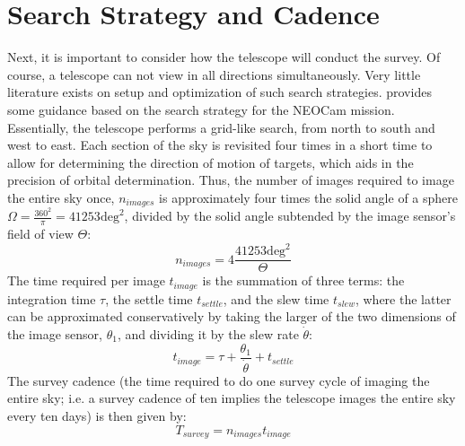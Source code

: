 \section{Search Strategy and Cadence}
\label{sec:modelling_cadence}
Next, it is important to consider how the telescope will conduct the survey. Of course, a telescope can not view in all directions simultaneously. Very little literature exists on setup and optimization of such search strategies. \cite{Cadence} provides some guidance based on the search strategy for the NEOCam mission. Essentially, the telescope performs a grid-like search, from north to south and west to east. Each section of the sky is revisited four times in a short time to allow for determining the direction of motion of targets, which aids in the precision of orbital determination. Thus, the number of images required to image the entire sky once, $n_{images}$ is approximately four times the solid angle of a sphere $\Omega = \frac{360^2}{\pi} = 41253\mathrm{deg}^2$, divided by the solid angle subtended by the image sensor's field of view $\Theta$:
\begin{equation}
 n_{images} = 4\frac{41253\mathrm{deg}^2}{\Theta}
\end{equation}
The time required per image $t_{image}$ is the summation of three terms: the integration time $\tau$, the settle time $t_{settle}$, and the slew time $t_{slew}$, where the latter can be approximated conservatively by taking the larger of the two dimensions of the image sensor, $\theta_1$, and dividing it by the slew rate $\dot{\theta}$:
\begin{equation}
 t_{image} = \tau + \frac{\theta_1}{\dot{\theta}} + t_{settle}
\end{equation}
The survey cadence (the time required to do one survey cycle of imaging the entire sky; i.e. a survey cadence of ten implies the telescope images the entire sky every ten days) is then given by:
\begin{equation}
 T_{survey} = n_{images}t_{image}
\end{equation}

